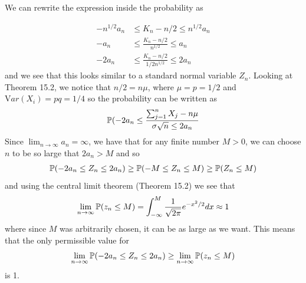 
We can rewrite the expression inside the probability as

\begin{align*}
    - n^{1/2} a_{n} &\leq K_{n} - n/2 \leq n^{1/2} a_{n}  \\
              -a_{n}& \leq \frac{K_{n} -n/2}{n^{1/2} } \leq a_{n} \\
	      -2 a_{n} & \leq \frac{K_{n} -n/2}{1/2 n^{1/2} } \leq 2 a_{n} 
\end{align*}
and we see that this looks similar to a standard normal variable $ Z_{n} $. Looking at Theorem 15.2,
we notice that $ n/2 = n \mu$, where $ \mu = p = 1/2$ and $ \mathrm Var(X_{i} ) = pq = 1/4$ so the
probability can be written as
\begin{align*}
    \P ( -2 a_{n} \leq \frac{\sum_{j=1}^{n} X_{j} - n \mu}{\sigma \sqrt{n} \leq 2 a_{n} } 
\end{align*}
Since $ \lim_{n \to \infty} a_{n} = \infty$, we have that for any finite number $ M > 0$, we can
choose $ n$ to be so large that $ 2a_{n} > M $ and so
\begin{align*}
    \P(-2 a_{n} \leq Z_{n} \leq 2 a_{n} ) \geq \P(-M \leq Z_{n} \leq M) \geq \P( Z_{n} \leq M) 
\end{align*}
and using the central limit theorem (Theorem 15.2) we see that 
\begin{align*}
    \lim_{n \to \infty} \P( z_{n} \leq M)  = \int_{-\infty}^{M} \frac{1}{\sqrt{2\pi}}e^{-x^2/2} dx
    \approx 1 
\end{align*}
where since $ M$ was arbitrarily chosen, it can be as large as we want. This means that the only
permissible value for 
\[
    \lim_{n \to \infty} \P( -2 a_{n} \leq Z_{n} \leq 2 a_{n} ) \geq \lim_{n \to \infty} \P( z_{n} \leq M)
\] 
is 1.

